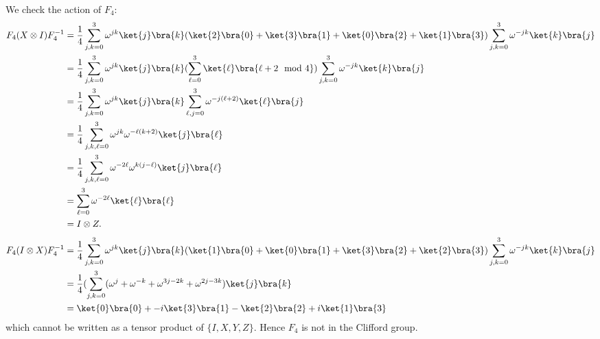 \documentclass[letterpaper,12pt,oneside,onecolumn]{article}
\begin{document}
\paragraph{}
We check the action of $F_4$:
\begin{align*}
F_4(X\otimes I) F_4^{-1} &= \frac{1}{4} \sum_{j,k = 0}^3 \omega^{jk}\ket{j}\bra{k}(\ket{2}\bra{0} + \ket{3}\bra{1} + \ket{0}\bra{2} + \ket{1}\bra{3})\sum_{j,k = 0}^3 \omega^{-jk}\ket{k}\bra{j}\\
&= \frac{1}{4} \sum_{j,k = 0}^3 \omega^{jk}\ket{j}\bra{k}(\sum_{\ell=0}^3 \ket{\ell}\bra{\ell + 2 \mod 4})\sum_{j,k=0}^3\omega^{-jk}\ket{k}\bra{j}\\
&=  \frac{1}{4} \sum_{j,k = 0}^3 \omega^{jk}\ket{j}\bra{k}\sum_{\ell,j=0}^3 \omega^{-j(\ell+2)}\ket{\ell}\bra{j} \\
&=\frac{1}{4} \sum_{j,k,\ell=0}^3 \omega^{jk}\omega^{-\ell(k+2)}\ket{j}\bra{\ell} \\
&=\frac{1}{4} \sum_{j,k,\ell=0}^3\omega^{-2\ell} \omega^{k(j-\ell)} \ket{j}\bra{\ell}\\
&=\sum_{\ell=0}^3\omega^{-2\ell} \ket{\ell}\bra{\ell}\\
&= I \otimes Z.
\end{align*}
\begin{align*}
F_4(I\otimes X) F_4^{-1} &= \frac{1}{4} \sum_{j,k = 0}^3 \omega^{jk}\ket{j}\bra{k}(\ket{1}\bra{0} + \ket{0}\bra{1} + \ket{3}\bra{2} +\ket{2}\bra{3})\sum_{j,k = 0}^3 \omega^{-jk}\ket{k}\bra{j} \\
&= \frac{1}{4}(\sum_{j,k=0}^3(\omega^{j} + \omega^{-k} + \omega^{3j - 2k} + \omega^{2j - 3k})\ket{j}\bra{k} \\
&= \ket{0}\bra{0} + -i\ket{3}\bra{1} - \ket{2}\bra{2} + i \ket{1}\bra{3}
\end{align*}
which cannot be written as a tensor product of $\{I, X, Y, Z\}$. Hence $F_4$ is not in the Clifford group.
\end{document}
